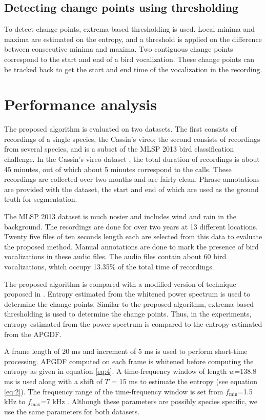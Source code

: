 \documentclass[a4paper]{article}
\begin{document}
\subsection{Detecting change points using thresholding}
To detect change points, extrema-based thresholding is used. Local minima and
maxima are estimated on the entropy, and a threshold is applied on the
difference between consecutive minima and maxima. Two contiguous change points
correspond to the start and end of a bird vocalization. These change points can
be tracked back to get the start and end time of the vocalization in the
recording.     
   
\section{Performance analysis}


The proposed algorithm is evaluated on two datasets. The first consists of
recordings of a single species, the Cassin's vireo; the second consists of
recordings from several species, and is a subset of the MLSP 2013 bird
classification challenge.
In the Cassin's vireo dataset \cite{data1}, the total duration
of recordings is about 45 minutes, out of which about 5 minutes correspond to
the calls. These recordings are collected over two months and are fairly clean.
Phrase annotations are provided with the dataset, the start and end of which
are used as the ground truth for segmentation. 

The MLSP 2013 dataset \cite{data2} is much nosier and includes wind and rain in
the background. The recordings are done for over two years at 13 different
locations. Twenty five files of ten seconds length each are selected from this
data to evaluate the proposed method.  Manual annotations are done to mark the
presence of bird vocalizations in these audio files. The audio files contain
about 60 bird vocalizations, which occupy 13.35\% of the total time of
recordings.

The proposed algorithm is compared with a modified version of technique proposed
in \cite{wang2013}. Entropy estimated from the whitened power spectrum is used
to determine the change points. Similar to the proposed algorithm, extrema-based
thresholding is used to determine the change points. Thus, in the experiments,
entropy estimated from the power spectrum is compared to the entropy estimated
from the APGDF.
 
A frame length of 20 ms and increment of 5 ms is used to perform short-time
processing. APGDF computed on each frame is whitened before computing the
entropy as given in equation \ref{eq:4}. A time-frequency window of length $w$=138.8 ms
is used along with a shift of $T$ = 15 ms to estimate the entropy (see
equation \ref{eq:2}). The frequency range of the
time-frequency window is set from $f_{\min}$=1.5 kHz to $f_{\max}$=7 kHz
\cite{wang2013}. Although these parameters are possibly species specific, 
we use the same parameters for both datasets.
\end{document}
